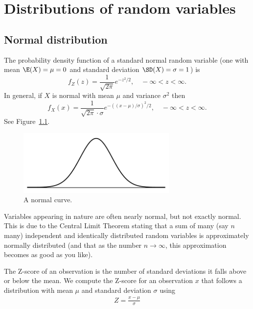 \chapter{Distributions of random variables}
\label{modeling}


\section{Normal distribution}\label{997}
\label{normalDist}

The probability density function of a standard normal random variable (one with mean $\E(X)=\mu=0$ and standard deviation $\SD(X)=\sigma=1$) is
\[
	f_Z(z) = \frac1{\sqrt{2\pi}} e^{-z^2/2},\quad -\infty<z<\infty.
\]
In general, if $X$ is normal with mean $\mu$ and variance $\sigma^2$ then
\[
	f_X(x) = \frac1{\sqrt{2\pi}\cdot\sigma} e^{-((x-\mu)/\sigma)^2/2},\quad -\infty<z<\infty.
\]
See Figure~\ref{simpleNormal}.

\begin{figure}
\centering
\includegraphics[width=0.7\textwidth]{ch_distributions/figures/simpleNormal/simpleNormal}
\caption{A normal curve.}
\label{simpleNormal}
\end{figure}

\begin{termBox}{
Variables appearing in nature are often nearly normal, but not exactly normal. This is due to the Central Limit Theorem stating that a sum of many (say $n$ many) independent and identically distributed random variables is approximately normally distributed (and that as the number $n\to\infty$, this approximation becomes as good as you like).\vspace{0.7mm}}
\end{termBox}

\begin{termBox}{
The Z-score of an observation is the number of standard deviations it falls above or below the mean. We compute the Z-score for an observation $x$ that follows a distribution with mean $\mu$ and standard deviation $\sigma$ using
\begin{eqnarray*}
Z = \frac{x-\mu}{\sigma}
\end{eqnarray*}}
\end{termBox}

